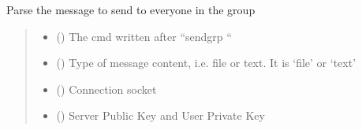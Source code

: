 \documentclass[letterpaper,10pt,english]{sphinxmanual}
\begin{document}

\begin{fulllineitems}
\label{\detokenize{userInputHandler:userInputHandler.sendGroupMessage}}
\pysigstartsignatures
{}
\pysigstopsignatures
\sphinxAtStartPar
Parse the message to send to everyone in the group
\begin{quote}\begin{description}
\begin{itemize}
\item {} 
\sphinxAtStartPar
{} () \textendash{} The cmd written after “sendgrp “

\item {} 
\sphinxAtStartPar
{} () \textendash{} Type of message content, i.e. file or text. It is ‘file’ or ‘text’

\item {} 
\sphinxAtStartPar
{} () \textendash{} Connection socket

\item {} 
\sphinxAtStartPar
{} () \textendash{} Server Public Key and User Private Key

\end{itemize}

\end{description}\end{quote}

\end{fulllineitems}

\end{document}

